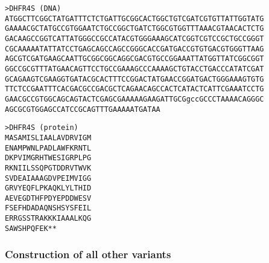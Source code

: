 %
\begin{footnotesize}
\begin{minipage}[t]{9cm}
\begin{verbatim}
>DHFR4S (DNA)
ATGGCTTCGGCTATGATTTCTCTGATTGCGGCACTGGCTGTCGATCGTGTTATTGGTATG
GAAAACGCTATGCCGTGGAATCTGCCGGCTGATCTGGCGTGGTTTAAACGTAACACTCTG
GACAAGCCGGTCATTATGGGCCGCCATACGTGGGAAAGCATCGGTCGTCCGCTGCCGGGT
CGCAAAAATATTATCCTGAGCAGCCAGCCGGGCACCGATGACCGTGTGACGTGGGTTAAG
AGCGTCGATGAAGCAATTGCGGCGGCAGGCGACGTGCCGGAAATTATGGTTATCGGCGGT
GGCCGCGTTTATGAACAGTTCCTGCCGAAAGCCCAAAAGCTGTACCTGACCCATATCGAT
GCAGAAGTCGAAGGTGATACGCACTTTCCGGACTATGAACCGGATGACTGGGAAAGTGTG
TTCTCCGAATTTCACGACGCCGACGCTCAGAACAGCCACTCATACTCATTCGAAATCCTG
GAACGCCGTGGCAGCAGTACTCGAGCGAAAAAGAAGATTGCGgccGCCCTAAAACAGGGC
AGCGCGTGGAGCCATCCGCAGTTTGAAAAATGATAA
\end{verbatim}
\end{minipage}
%

%
\begin{minipage}[t]{3cm}
\begin{verbatim}
>DHFR4S (protein)
MASAMISLIAALAVDRVIGM
ENAMPWNLPADLAWFKRNTL
DKPVIMGRHTWESIGRPLPG
RKNIILSSQPGTDDRVTWVK
SVDEAIAAAGDVPEIMVIGG
GRVYEQFLPKAQKLYLTHID
AEVEGDTHFPDYEPDDWESV
FSEFHDADAQNSHSYSFEIL
ERRGSSTRAKKKIAAALKQG
SAWSHPQFEK**
\end{verbatim}
\end{minipage}
\end{footnotesize}
%


\subsubsection{Construction of all other variants}


